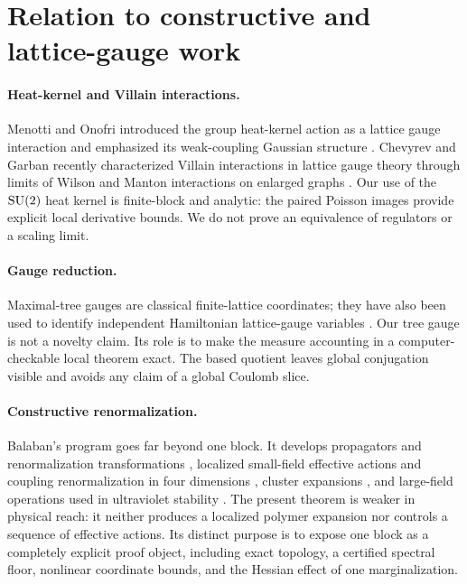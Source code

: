 \section{Relation to constructive and lattice-gauge work}\label{sec:related}

\paragraph{Heat-kernel and Villain interactions.}
Menotti and Onofri introduced the group heat-kernel action as a lattice gauge
interaction and emphasized its weak-coupling Gaussian structure
\cite{MenottiOnofri1981}.  Chevyrev and Garban recently characterized Villain
interactions in lattice gauge theory through limits of Wilson and Manton
interactions on enlarged graphs \cite{ChevyrevGarban2025}.  Our use of the
$\mathrm{SU}(2)$ heat kernel is finite-block and analytic: the paired Poisson images
provide explicit local derivative bounds.  We do not prove an equivalence of
regulators or a scaling limit.

\paragraph{Gauge reduction.}
Maximal-tree gauges are classical finite-lattice coordinates; they have also
been used to identify independent Hamiltonian lattice-gauge variables
\cite{LigterinkWaletBishop2000}.  Our tree gauge is not a novelty claim.  Its
role is to make the measure accounting in a computer-checkable local theorem
exact.  The based quotient leaves global conjugation visible and avoids any
claim of a global Coulomb slice.

\paragraph{Constructive renormalization.}
Balaban's program goes far beyond one block.  It develops propagators and
renormalization transformations \cite{Balaban1984}, localized small-field
effective actions and coupling renormalization in four dimensions
\cite{Balaban1987}, cluster expansions \cite{Balaban1988}, and large-field
operations used in ultraviolet stability \cite{Balaban1989}.  The present
theorem is weaker in physical reach: it neither produces a localized polymer
expansion nor controls a sequence of effective actions.  Its distinct purpose
is to expose one block as a completely explicit proof object, including exact
topology, a certified spectral floor, nonlinear coordinate bounds, and the
Hessian effect of one marginalization.

